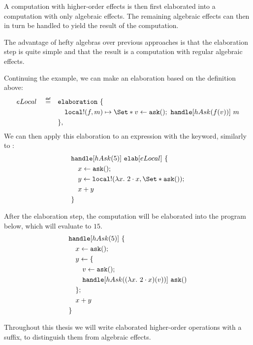 A computation with higher-order effects is then first elaborated into a computation with only algebraic effects. The remaining algebraic effects can then in turn be handled to yield the result of the computation.

The advantage of hefty algebras over previous approaches is that the elaboration step is quite simple and that the result is a computation with regular algebraic effects.

Continuing the \olocal example, we can make an elaboration based on the definition above:
\begin{align*}
    eLocal \quad\defeq\quad
        &\elaboration\ \{ \\
        &\quad\olocal!(f, m) \mapsto \S{v \gets \oask()\seq \handle[hAsk(f(v))]\ m }\\
        &\},
\end{align*}
We can then apply this elaboration to an expression with the \elab keyword, similarly to \handle:
\begin{align*}
    &\handle[hAsk(5)]\ \elab[eLocal]\ \{ \\
    &\quad x \gets \oask();\\
    &\quad y \gets \olocal!(\lambda x.\ 2\cdot x, \S{ \oask() });\\
    &\quad x + y \\
    &\}
\end{align*}

After the elaboration step, the computation will be elaborated into the program below, which will evaluate to $15$.
\begin{align*}
    &\text{\texttt{handle}}[hAsk(5)]\ \{ \\
    &\quad x \gets \mathtt{ask}();\\
    &\quad y \gets \{\\
    &\quad\quad v \gets \mathtt{ask}();\\
    &\quad\quad \text{\texttt{handle}}[hAsk((\lambda x.\ 2\cdot x)(v))]\ \mathtt{ask}()\\
    &\quad\};\\
    &\quad x + y \\
    &\}
\end{align*}

Throughout this thesis we will write elaborated higher-order operations with a \code{!} suffix, to distinguish them from algebraic effects.

